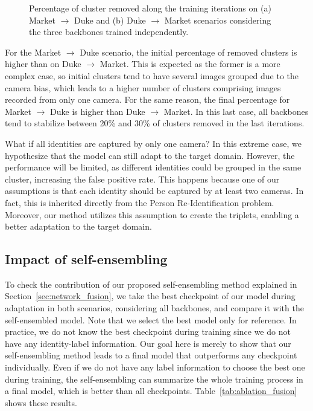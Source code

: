 \documentclass[journal]{IEEEtran}
\begin{document}
\begin{figure}[ht]
\centering
{}
\hfil
{}
\caption{Percentage of cluster removed along the training iterations on (a) Market $\rightarrow$ Duke and (b) Duke $\rightarrow$ Market scenarios considering the three backbones trained independently.}
\label{fig:cluster_remotion_progress}
\end{figure}

For the Market $\rightarrow $ Duke scenario, the initial percentage of removed clusters is higher than on Duke $\rightarrow$ Market. This is expected as the former is a more complex case, so initial clusters tend to have several images grouped due to the camera bias, which leads to a higher number of clusters comprising images recorded from only one camera. For the same reason, the final percentage for Market $\rightarrow$ Duke is higher than Duke $\rightarrow$ Market. In this last case, all backbones tend to stabilize between 20\% and 30\% of clusters removed in the last iterations. 

What if all identities are captured by only one camera? In this extreme case, we hypothesize that the model can still adapt to the target domain. However, the performance will be limited, as different identities could be grouped in the same cluster, increasing the false positive rate. This happens because one of our assumptions is that each identity should be captured by at least two cameras. In fact, this is inherited directly from the Person Re-Identification problem. Moreover, our method utilizes this assumption to create the triplets, enabling a better adaptation to the target domain. 




\subsection{Impact of self-ensembling}

To check the contribution of our proposed self-ensembling method explained in Section~\ref{sec:network_fusion}, we take the best checkpoint of our model during adaptation in both scenarios, considering all backbones, and compare it with the self-ensembled model. Note that we select the best model only for reference. In practice, we do not know the best checkpoint during training since we do not have any identity-label information. Our goal here is merely to show that our self-ensembling method leads to a final model that outperforms any checkpoint individually. Even if we do not have any label information to choose the best one during training, the self-ensembling can summarize the whole training process in a final model, which is better than all checkpoints. Table~\ref{tab:ablation_fusion} shows these results.
\end{document}
